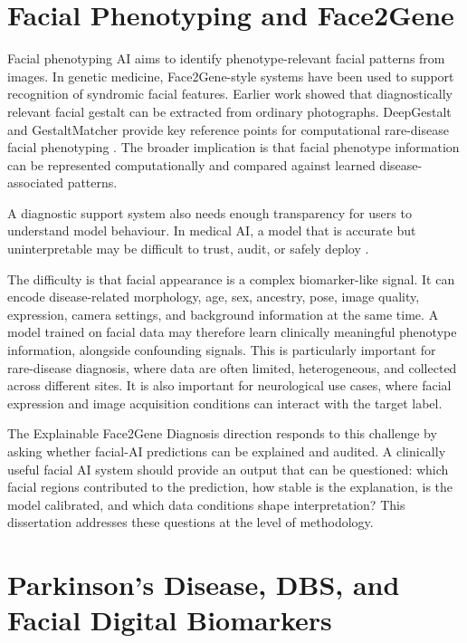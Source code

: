 
\section{Facial Phenotyping and Face2Gene}

Facial phenotyping AI aims to identify phenotype-relevant facial patterns from images. In genetic medicine, Face2Gene-style systems have been used to support recognition of syndromic facial features. Earlier work showed that diagnostically relevant facial gestalt can be extracted from ordinary photographs. DeepGestalt and GestaltMatcher provide key reference points for computational rare-disease facial phenotyping   . The broader implication is that facial phenotype information can be represented computationally and compared against learned disease-associated patterns.


A diagnostic support system also needs enough transparency for users to understand model behaviour. In medical AI, a model that is accurate but uninterpretable may be difficult to trust, audit, or safely deploy  .


The difficulty is that facial appearance is a complex biomarker-like signal. It can encode disease-related morphology, age, sex, ancestry, pose, image quality, expression, camera settings, and background information at the same time. A model trained on facial data may therefore learn clinically meaningful phenotype information, alongside confounding signals. This is particularly important for rare-disease diagnosis, where data are often limited, heterogeneous, and collected across different sites. It is also important for neurological use cases, where facial expression and image acquisition conditions can interact with the target label.


The Explainable Face2Gene Diagnosis direction responds to this challenge by asking whether facial-AI predictions can be explained and audited. A clinically useful facial AI system should provide an output that can be questioned: which facial regions contributed to the prediction, how stable is the explanation, is the model calibrated, and which data conditions shape interpretation? This dissertation addresses these questions at the level of methodology.


\section{Parkinson's Disease, DBS, and Facial Digital Biomarkers}

